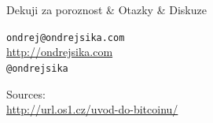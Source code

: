 \documentclass{beamer}
\begin{document}
\begin{frame}

    {\LARGE Dekuji za poroznost \& Otazky \& Diskuze}\\

    \vspace{1cm}

    \texttt{ondrej@ondrejsika.com}\\
    \url{http://ondrejsika.com}\\
    \texttt{@ondrejsika}\\

    \vspace{1cm}

    Sources:\\
    \url{http://url.os1.cz/uvod-do-bitcoinu/}
\end{frame}
\end{document}
